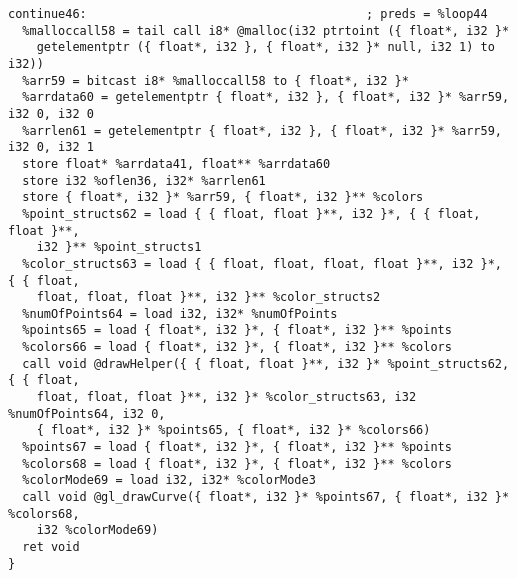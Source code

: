 \documentclass[main.tex]{subfiles}
\begin{document}
{\begin{lstlisting}
continue46:                                       ; preds = %loop44
  %malloccall58 = tail call i8* @malloc(i32 ptrtoint ({ float*, i32 }* 
    getelementptr ({ float*, i32 }, { float*, i32 }* null, i32 1) to i32))
  %arr59 = bitcast i8* %malloccall58 to { float*, i32 }*
  %arrdata60 = getelementptr { float*, i32 }, { float*, i32 }* %arr59, i32 0, i32 0
  %arrlen61 = getelementptr { float*, i32 }, { float*, i32 }* %arr59, i32 0, i32 1
  store float* %arrdata41, float** %arrdata60
  store i32 %oflen36, i32* %arrlen61
  store { float*, i32 }* %arr59, { float*, i32 }** %colors
  %point_structs62 = load { { float, float }**, i32 }*, { { float, float }**, 
    i32 }** %point_structs1
  %color_structs63 = load { { float, float, float, float }**, i32 }*, { { float,
    float, float, float }**, i32 }** %color_structs2
  %numOfPoints64 = load i32, i32* %numOfPoints
  %points65 = load { float*, i32 }*, { float*, i32 }** %points
  %colors66 = load { float*, i32 }*, { float*, i32 }** %colors
  call void @drawHelper({ { float, float }**, i32 }* %point_structs62, { { float,
    float, float, float }**, i32 }* %color_structs63, i32 %numOfPoints64, i32 0,
    { float*, i32 }* %points65, { float*, i32 }* %colors66)
  %points67 = load { float*, i32 }*, { float*, i32 }** %points
  %colors68 = load { float*, i32 }*, { float*, i32 }** %colors
  %colorMode69 = load i32, i32* %colorMode3
  call void @gl_drawCurve({ float*, i32 }* %points67, { float*, i32 }* %colors68,
    i32 %colorMode69)
  ret void
}


\end{lstlisting}}
\end{document}
